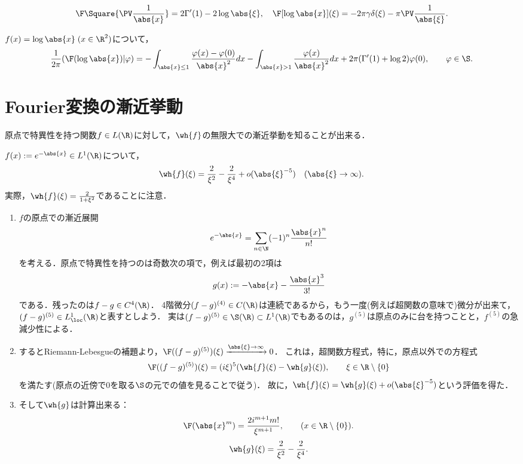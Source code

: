 \documentclass[uplatex,dvipdfmx]{jsreport}
\begin{document}
\begin{proposition}
    \[\F\Square{\PV\frac{1}{\abs{x}}}=2\Gamma'(1)-2\log\abs{\xi},\quad\F[\log\abs{x}](\xi)=-2\pi\gamma\delta(\xi)-\pi\PV\frac{1}{\abs{\xi}}.\]
\end{proposition}

\begin{proposition}
    $f(x)=\log\abs{x}\;(x\in\R^2)$について，
    \[\frac{1}{2\pi}(\F(\log\abs{x})|\varphi)=-\int_{\abs{x}\le1}\frac{\varphi(x)-\varphi(0)}{\abs{x}^2}dx-\int_{\abs{x}>1}\frac{\varphi(x)}{\abs{x}^2}dx+2\pi(\Gamma'(1)+\log 2)\varphi(0),\qquad\varphi\in\S.\]
\end{proposition}

\section{Fourier変換の漸近挙動}

\begin{tcolorbox}[colframe=ForestGreen, colback=ForestGreen!10!white,breakable,colbacktitle=ForestGreen!40!white,coltitle=black,fonttitle=\bfseries\sffamily,
title=]
    原点で特異性を持つ関数$f\in L(\R)$に対して，$\wh{f}$の無限大での漸近挙動を知ることが出来る．
\end{tcolorbox}

\begin{example}
    $f(x):=e^{-\abs{x}}\in L^1(\R)$について，
    \[\wh{f}(\xi)=\frac{2}{\xi^2}-\frac{2}{\xi^4}+o(\abs{\xi}^{-5})\quad(\abs{\xi}\to\infty).\]
    実際，$\wh{f}(\xi)=\frac{2}{1+\xi^2}$であることに注意．
\end{example}
\begin{Proof}\mbox{}
    \begin{enumerate}[{Step}1]
        \item $f$の原点での漸近展開
        \[e^{-\abs{x}}=\sum_{n\in\N}(-1)^n\frac{\abs{x}^n}{n!}\]
        を考える．原点で特異性を持つのは奇数次の項で，例えば最初の2項は
        \[g(x):=-\abs{x}-\frac{\abs{x}^3}{3!}\]
        である．残ったのは$f-g\in C^4(\R)$．
        4階微分$(f-g)^{(4)}\in C(\R)$は連続であるから，もう一度(例えば超関数の意味で)微分が出来て，$(f-g)^{(5)}\in L^1_\loc(\R)$と表すとしよう．
        実は$(f-g)^{(5)}\in\S(\R)\subset L^1(\R)$でもあるのは，$g^{(5)}$は原点のみに台を持つことと，$f^{(5)}$の急減少性による．
        \item するとRiemann-Lebesgueの補題より，$\F((f-g)^{(5)})(\xi)\xrightarrow{\abs{\xi}\to\infty}0$．
        これは，超関数方程式，特に，原点以外での方程式
        \[\F((f-g)^{(5)})(\xi)=(i\xi)^5(\wh{f}(\xi)-\wh{g}(\xi)),\qquad \xi\in\R\setminus\{0\}\]
        を満たす(原点の近傍で$0$を取る$\S$の元での値を見ることで従う)．
        故に，$\wh{f}(\xi)=\wh{g}(\xi)+o(\abs{\xi}^{-5})$という評価を得た．
        \item そして$\wh{g}$は計算出来る：
        \[\F(\abs{x}^m)=\frac{2i^{m+1}m!}{\xi^{m+1}},\qquad(x\in\R\setminus\{0\}).\]
        \[\wh{g}(\xi)=\frac{2}{\xi^2}-\frac{2}{\xi^4}.\]
    \end{enumerate}
\end{Proof}
\end{document}
